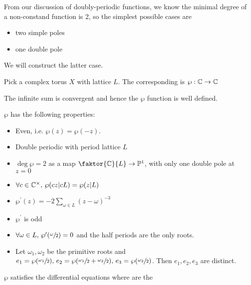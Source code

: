 \documentclass{article}
\begin{document}
From our discussion of doubly-periodic functions, we know the minimal degree of a non-constand function is 2, so the simplest possible cases are 
\begin{itemize}
	\item two simple poles
	\item one double pole
\end{itemize}
We will construct the latter case.

\begin{definition}
	Pick a complex torus $X$ with lattice $L$. The corresponding  is $\wp:\mathbb{C} \to \mathbb{C}$ 
\end{definition}

\begin{prop}
	The infinite sum is convergent and hence the $\wp$ function is well defined.
\end{prop}

\begin{prop}
	$\wp$ has the following properties:
	\begin{itemize}
		\item Even, i.e. $\wp(z) = \wp(-z)$.
		\item Double periodic with period lattice $L$
		\item $\deg \wp = 2$ as a map $\faktor{\mbb{C}}{L} \to \mbb{P}^1$, with only one double pole at $z=0$
		\item $\forall c \in \mathbb{C}^\times, \, \wp(cz | cL) = \wp(z | L)$
		\item $\wp^\prime(z) = -2\sum_{\omega \in L} (z-\omega)^{-3}$
		\item $\wp^\prime$ is odd
		\item $\forall \omega \in L, \, \wp^\prime(\sfrac{\omega}{2}) =0$ and the half periods are the only roots. 
		\item Let $\omega_1, \omega_2$ be the primitive roots and $e_1 = \wp(\sfrac{\omega_1}{2}), \, e_2 = \wp(\sfrac{\omega_1}{2} + \sfrac{\omega_2}{2}), \, e_3 = \wp(\sfrac{\omega_2}{2})$. Then $e_1, e_2, e_3$ are distinct.
	\end{itemize}
\end{prop}

\begin{prop}
	$\wp$ satisfies the differential equations 
	where 
	are the 
\end{prop}
\end{document}
